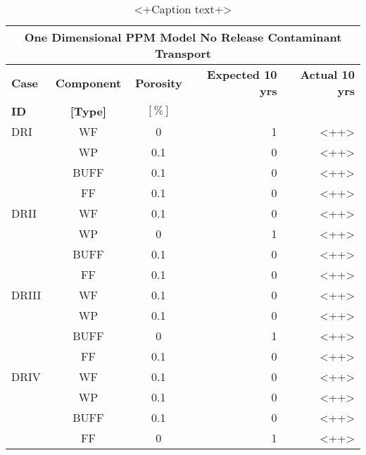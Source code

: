 \begin{table}
\centering
\footnotesize{
\begin{tabularx}{\textwidth}{|X|c|c|r|r|}
  \multicolumn{5}{c}{\textbf{One Dimensional PPM Model No Release Contaminant Transport}} \\
  \hline
  \textbf{Case}  &  \textbf{Component} &  \textbf{Porosity} & \textbf{Expected 10 yrs} & \textbf{Actual 10 yrs} \\
  \textbf{ID}    & \textbf{[Type]} &      $[\%]$            &                          &  \\
  \hline
  DRI     &  WF    &  0   & 1 & <++> \\
          &  WP    &  0.1 & 0 & <++> \\
          &  BUFF  &  0.1 & 0 & <++> \\
          &  FF    &  0.1 & 0 & <++> \\
  \hline
  DRII    &  WF    &  0.1 & 0 & <++> \\
          &  WP    &  0   & 1 & <++> \\
          &  BUFF  &  0.1 & 0 & <++> \\
          &  FF    &  0.1 & 0 & <++> \\
  \hline
  DRIII   &  WF    &  0.1 & 0 & <++> \\
          &  WP    &  0.1 & 0 & <++> \\
          &  BUFF  &  0   & 1 & <++> \\
          &  FF    &  0.1 & 0 & <++> \\
  \hline
  DRIV    &  WF    &  0.1 & 0 & <++> \\
          &  WP    &  0.1 & 0 & <++> \\
          &  BUFF  &  0.1 & 0 & <++> \\
          &  FF    &  0   & 1 & <++> \\
  \hline
\end{tabularx}
\caption{<+Caption text+>}
\label{tab:<+label+>}
}
\end{table}
